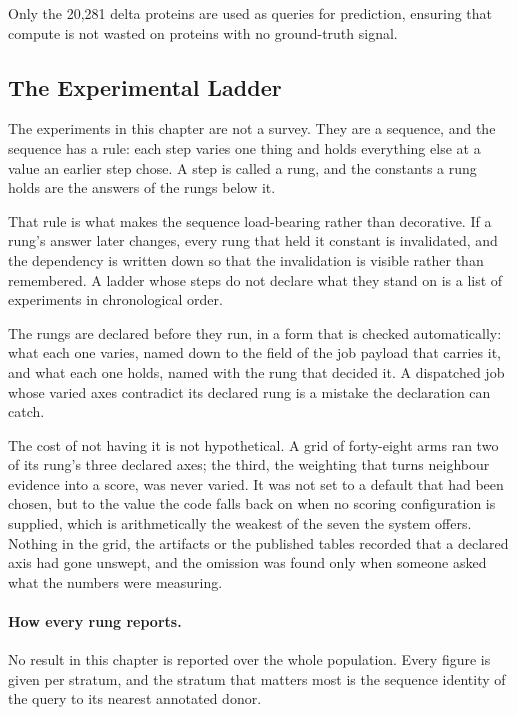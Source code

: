 Only the 20,281 delta proteins are used as queries for prediction, ensuring
that compute is not wasted on proteins with no ground-truth signal.

\subsection{The Experimental Ladder}
\label{subsec:ladder}

The experiments in this chapter are not a survey. They are a sequence, and
the sequence has a rule: each step varies one thing and holds everything
else at a value an earlier step chose. A step is called a rung, and the
constants a rung holds are the answers of the rungs below it.

That rule is what makes the sequence load-bearing rather than decorative.
If a rung's answer later changes, every rung that held it constant is
invalidated, and the dependency is written down so that the invalidation is
visible rather than remembered. A ladder whose steps do not declare what
they stand on is a list of experiments in chronological order.

The rungs are declared before they run, in a form that is checked
automatically: what each one varies, named down to the field of the job
payload that carries it, and what each one holds, named with the rung that
decided it. A dispatched job whose varied axes contradict its declared rung
is a mistake the declaration can catch.

The cost of not having it is not hypothetical. A grid of forty-eight arms
ran two of its rung's three declared axes; the third, the weighting that
turns neighbour evidence into a score, was never varied. It was not set to
a default that had been chosen, but to the value the code falls back on
when no scoring configuration is supplied, which is arithmetically the
weakest of the seven the system offers. Nothing in the grid, the artifacts
or the published tables recorded that a declared axis had gone unswept,
and the omission was found only when someone asked what the numbers were
measuring.

\paragraph{How every rung reports.}
No result in this chapter is reported over the whole population. Every
figure is given per stratum, and the stratum that matters most is the
sequence identity of the query to its nearest annotated donor.

